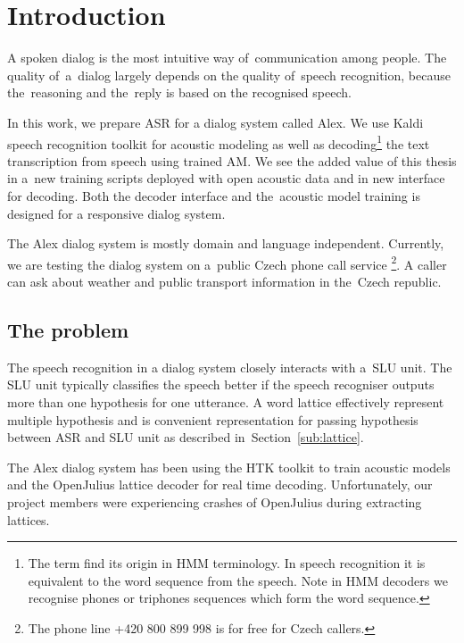 \chapter{Introduction}
\label{chap:intro}

A spoken dialog is the most intuitive way of~communication among people. 
The quality of~a~dialog largely depends on the quality 
of~speech recognition, because the~reasoning and the~reply is based on the recognised speech. 

In this work, we prepare \acl{ASR} for a dialog system called Alex. 
We use Kaldi\cite{povey2011kaldi} speech recognition toolkit for acoustic modeling 
as well as decoding\footnote{The term  find its origin in \acs{HMM} terminology. In speech recognition it is equivalent to  the word sequence from the speech. Note in HMM decoders we recognise phones or triphones sequences which form the word sequence.} the text transcription from speech using trained \acl{AM}.
We see the added value of this thesis in a~new training scripts deployed with open acoustic data\cite{korvas_2014}
and in new interface for decoding. Both the decoder interface and the~acoustic model training is designed 
for a responsive dialog system. 

The Alex dialog system is mostly domain and language independent.
Currently, we are testing the dialog system on a~public Czech phone call service
\footnote{The phone line +420 800 899 998 is for free for Czech callers.}.
A caller can ask about weather and public transport information in the~Czech republic.

\section{The problem} 
\label{sec:problem}

The speech recognition in a dialog system closely interacts with a~\acl{SLU} unit.
The \ac{SLU} unit typically classifies the speech better 
if the speech recogniser outputs more than one hypothesis for one utterance. 
A word lattice effectively represent multiple hypothesis and is convenient
representation for passing hypothesis between \ac{ASR} and \ac{SLU} unit 
as described in~Section~\ref{sub:lattice}.

The Alex dialog system has been using the \ac{HTK} toolkit\cite{young94htk} 
to train acoustic models and 
the OpenJulius\cite{lee2009julius} lattice decoder for real time decoding. 
Unfortunately, our project members were experiencing crashes 
of OpenJulius during extracting lattices.


